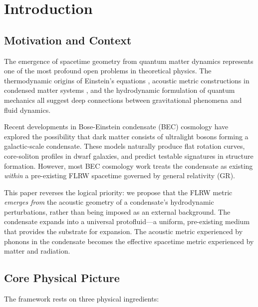 \documentclass[11pt,a4paper]{article}
\theoremstyle{definition}
\theoremstyle{remark}
\begin{document}
\section{Introduction}
\label{sec:introduction}

\subsection{Motivation and Context}
\label{sec:motivation}

The emergence of spacetime geometry from quantum matter dynamics represents one of the most profound open problems in theoretical physics. The thermodynamic origins of Einstein's equations \cite{Jacobson1995,Padmanabhan2010}, acoustic metric constructions in condensed matter systems \cite{Unruh1981,Barcelo2005}, and the hydrodynamic formulation of quantum mechanics \cite{Madelung1927} all suggest deep connections between gravitational phenomena and fluid dynamics.

Recent developments in Bose-Einstein condensate (BEC) cosmology \cite{Berezhiani2015,Suarez2014,Sharma2020} have explored the possibility that dark matter consists of ultralight bosons forming a galactic-scale condensate. These models naturally produce flat rotation curves, core-soliton profiles in dwarf galaxies, and predict testable signatures in structure formation. However, most BEC cosmology work treats the condensate as existing \emph{within} a pre-existing FLRW spacetime governed by general relativity (GR).

This paper reverses the logical priority: we propose that the FLRW metric \emph{emerges from} the acoustic geometry of a condensate's hydrodynamic perturbations, rather than being imposed as an external background. The condensate expands into a universal protofluid---a uniform, pre-existing medium that provides the substrate for expansion. The acoustic metric experienced by phonons in the condensate becomes the effective spacetime metric experienced by matter and radiation.

\subsection{Core Physical Picture}
\label{sec:physical_picture}

The framework rests on three physical ingredients:
\end{document}
